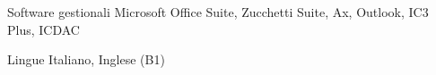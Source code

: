 


\begin{cvskills}


\cvskill
{Software gestionali} %
{Microsoft Office Suite, Zucchetti Suite, Ax, Outlook, IC3 Plus, ICDAC} %


\cvskill
{Lingue} %
{Italiano, Inglese (B1) } %


\end{cvskills}